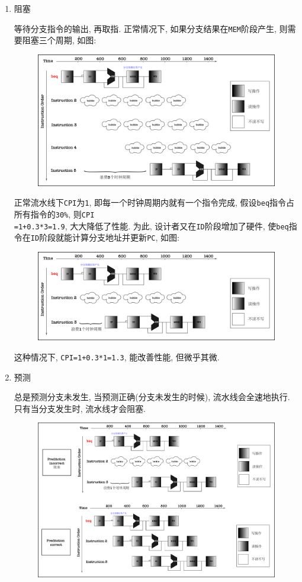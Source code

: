 \begin{enumerate}
\item 阻塞 \par 等待分支指令的输出, 再取指. 正常情况下, 如果分支结果在\verb|MEM|阶段产生, 则需要阻塞三个周期, 如图:
\begin{figure}[H]
\centering
\includegraphics[scale=.4]{img/figure47.pdf}
\end{figure}
正常流水线下\verb|CPI|为\verb|1|, 即每一个时钟周期内就有一个指令完成, 假设\verb|beq|指令占所有指令的\verb|30%|, 则\verb|CPI|\\\verb|=1+0.3*3=1.9|, 大大降低了性能. 为此, 设计者又在\verb|ID|阶段增加了硬件, 使\verb|beq|指令在\verb|ID|阶段就能计算分支地址并更新\verb|PC|, 如图:
\begin{figure}[H]
\centering
\includegraphics[scale=.4]{img/figure48.pdf}
\end{figure}
这种情况下, \verb|CPI=1+0.3*1=1.3|, 能改善性能, 但微乎其微.
\item 预测 \par 总是预测分支未发生, 当预测正确(分支未发生的时候), 流水线会全速地执行. 只有当分支发生时, 流水线才会阻塞.
\begin{figure}[H]
\centering
\includegraphics[scale=.35]{img/figure49.pdf}

\end{figure}
\end{enumerate}
